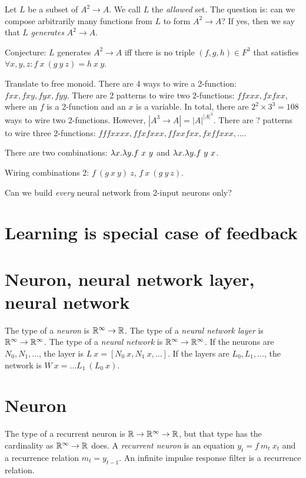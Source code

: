Let \(L\) be a subset of \( A^2 \to A \).
We call \(L\) the \emph{allowed} set.
The question is: can we compose arbitrarily many functions from \(L\)
to form \( A^2 \to A \)?
If yes, then we say that \(L\) \emph{generates} \( A^2 \to A \).

Conjecture: \(L\) generates \(A^2 \to A\) iff
there is no triple \((f,g,h)\in F^3\) that satisfies \( \forall x,y,z: f~x~(g~y~z) = h~x~y \).

Translate to free monoid.
There are 4 ways to wire a 2-function: \( fxx, fxy, fyx, fyy \).
There are 2 patterns to wire two 2-functions: \( ffxxx, fxfxx \),
where an \(f\) is a 2-function and an \(x\) is a variable.
In total, there are \( 2^2 \times 3^3 = 108 \) ways to wire two 2-functions.
However, \( |A^3 \to A| = |A|^{|A|^3} \).
There are ? patterns to wire three 2-functions: \( fffxxxx, ffxfxxx, ffxxfxx, fxffxxx, \ldots \).

There are two combinations: \(\lambda x. \lambda y. f~x~y\) and \(\lambda x. \lambda y. f~y~x\).

Wiring combinations 2: \(f~(g~x~y)~z\), \(f~x~(g~y~z)\).

Can we build \emph{every} neural network from 2-input neurons only?

\section{Learning is special case of feedback}

\section{Neuron, neural network layer, neural network}

%
%
%
The type of a \emph{neuron} is \(\mathbb{R}^\infty \to \mathbb{R}\).
The type of a \emph{neural network layer} is \(\mathbb{R}^\infty \to \mathbb{R}^\infty\).
The type of a \emph{neural network} is \(\mathbb{R}^\infty \to \mathbb{R}^\infty\).
If the neurons are \(N_0,N_1,\ldots\), the layer is \(L~x = [N_0~x, N_1~x, \ldots]\).
If the layers are \(L_0,L_1,\ldots\), the network is \(W~x = \ldots L_1~(L_0~x) \).

\section{Neuron}

The type of a recurrent neuron is \(\mathbb{R} \to \mathbb{R}^\infty \to \mathbb{R}\),
but that type has the cardinality as \(\mathbb{R}^\infty \to \mathbb{R}\) does.
A \emph{recurrent neuron} is an equation \(y_t = f~m_t~x_t\)
and a recurrence relation \(m_t = y_{t-1}\).
An infinite impulse response filter is a recurrence relation.

